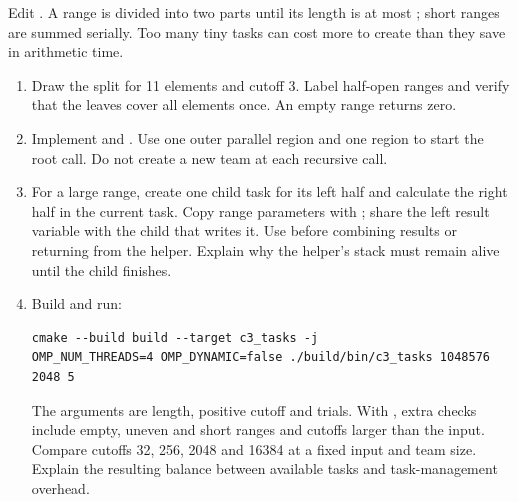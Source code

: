 Edit . A range is divided into two parts until its length is
at most ; short ranges are summed serially. Too many tiny tasks can
cost more to create than they save in arithmetic time.
\begin{enumerate}
\item Draw the split for 11 elements and cutoff 3. Label half-open ranges and
verify that the leaves cover all elements once. An empty range returns zero.
\item Implement  and . Use one outer parallel
region and one  region to start the root call. Do not create a new
team at each recursive call.
\item For a large range, create one child task for its left half and calculate
the right half in the current task. Copy range parameters with
; share the left result variable with the child that writes it.
Use  before combining results or returning from the helper.
Explain why the helper's stack must remain alive until the child finishes.
\item Build and run:
\begin{lstlisting}[style=shell]
cmake --build build --target c3_tasks -j
OMP_NUM_THREADS=4 OMP_DYNAMIC=false ./build/bin/c3_tasks 1048576 2048 5
\end{lstlisting}
The arguments are length, positive cutoff and trials. With , extra checks include empty,
uneven and short ranges and cutoffs larger than the input. Compare cutoffs
32, 256, 2048 and 16384 at a fixed input and team size. Explain the resulting
balance between available tasks and task-management overhead.
\end{enumerate}

